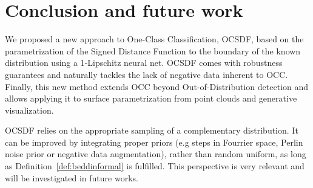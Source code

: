 \section{Conclusion and future work}
We proposed a new approach to One-Class Classification, OCSDF, based on the parametrization of the Signed Distance Function to the boundary of the known distribution using a 1-Lipschitz neural net. OCSDF comes with robustness guarantees and naturally tackles the lack of negative data inherent to OCC. Finally, this new method extends OCC beyond Out-of-Distribution detection and allows applying it to surface parametrization from point clouds and generative visualization.  

OCSDF relies on the appropriate sampling of a complementary distribution. It can be improved by integrating proper priors (e.g steps in Fourrier space, Perlin noise prior or negative data augmentation), rather than random uniform, as long as Definition~\ref{def:beddinformal} is fulfilled. This perspective is very relevant and will be investigated in future works. 

